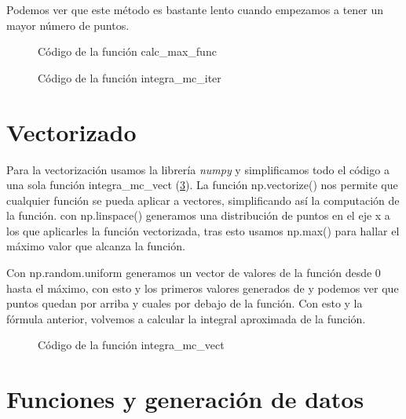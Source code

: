 \documentclass[6pt]{../../shared/AiTex}
\begin{document}
Podemos ver que este método es bastante lento cuando empezamos a tener un mayor número de puntos.

\begin{figure}[H]
    \centering
    
    \caption{Código de la función calc\_max\_func}
    \label{fig:calc_max_func}
\end{figure}

\begin{figure}[H]
    \centering
    
    \caption{Código de la función integra\_mc\_iter}
    \label{fig:integra_mc_iter}
\end{figure}

\section{Vectorizado}

Para la vectorización usamos la librería \textit{numpy} y simplificamos todo el código a una sola función \textcolor{codepurple}{integra\_mc\_vect} (\ref{fig:integra_mc_vect}). La función \textcolor{codepurple}{np.vectorize()} nos permite que cualquier función se pueda aplicar a vectores, simplificando así la computación de la función. con \textcolor{codepurple}{np.linspace()} generamos una distribución de puntos en el eje x a los que aplicarles la función vectorizada, tras esto usamos \textcolor{codepurple}{np.max()} para hallar el máximo valor que alcanza la función.

Con \textcolor{codepurple}{np.random.uniform} generamos un vector de valores de la función desde 0 hasta el máximo, con esto y los primeros valores generados de y podemos ver que puntos quedan por arriba y cuales por debajo de la función. Con esto y la fórmula anterior, volvemos a calcular la integral aproximada de la función.

\begin{figure}[H]
    \centering
    
    \caption{Código de la función integra\_mc\_vect}
    \label{fig:integra_mc_vect}
\end{figure}

\section{Funciones y generación de datos}
\end{document}
